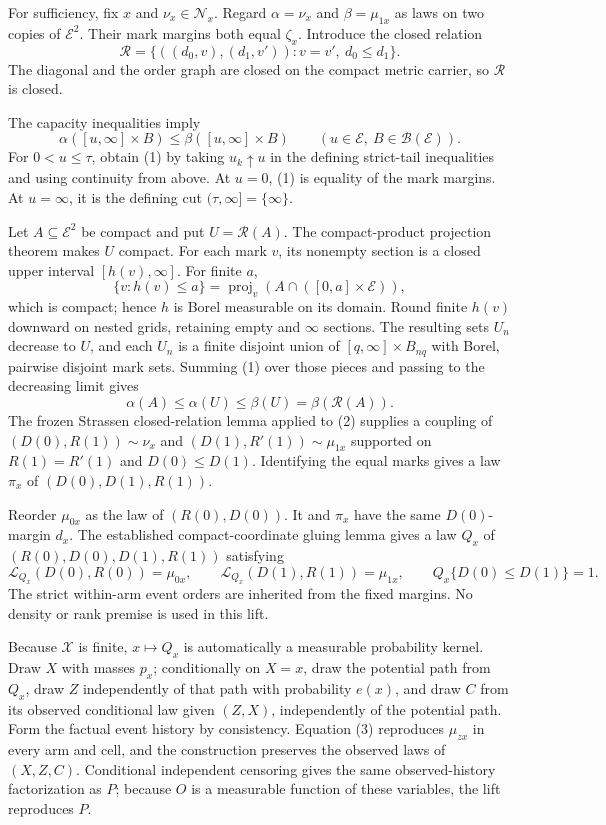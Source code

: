 For sufficiency, fix \(x\) and \(\nu_x\in\mathcal N_x\).  Regard \(\alpha=\nu_x\) and \(\beta=\mu_{1x}\) as laws on two copies of \(\mathcal E^2\).  Their mark margins both equal \(\zeta_x\).  Introduce the closed relation
\[
\mathcal R=\{((d_0,v),(d_1,v')):v=v',\ d_0\leq d_1\}.
\]
The diagonal and the order graph are closed on the compact metric carrier, so \(\mathcal R\) is closed.

The capacity inequalities imply
\[
\alpha([u,\infty]\times B)\leq\beta([u,\infty]\times B)
\qquad(u\in\mathcal E,\ B\in\mathscr B(\mathcal E)).                \tag{1}
\]
For \(0<u\leq\tau\), obtain (1) by taking \(u_k\uparrow u\) in the defining strict-tail inequalities and using continuity from above.  At \(u=0\), (1) is equality of the mark margins.  At \(u=\infty\), it is the defining cut \((\tau,\infty]=\{\infty\}\).

Let \(A\subseteq\mathcal E^2\) be compact and put \(U=\mathcal R(A)\).  The compact-product projection theorem makes \(U\) compact.  For each mark \(v\), its nonempty section is a closed upper interval \([h(v),\infty]\).  For finite \(a\),
\[
\{v:h(v)\leq a\}
=\operatorname{proj}_v\!\left(A\cap([0,a]\times\mathcal E)\right),
\]
which is compact; hence \(h\) is Borel measurable on its domain.  Round finite \(h(v)\) downward on nested grids, retaining empty and \(\infty\) sections.  The resulting sets \(U_n\) decrease to \(U\), and each \(U_n\) is a finite disjoint union of \([q,\infty]\times B_{nq}\) with Borel, pairwise disjoint mark sets.  Summing (1) over those pieces and passing to the decreasing limit gives
\[
\alpha(A)\leq\alpha(U)\leq\beta(U)=\beta(\mathcal R(A)).             \tag{2}
\]
The frozen Strassen closed-relation lemma applied to (2) supplies a coupling of \((D(0),R(1))\sim\nu_x\) and \((D(1),R'(1))\sim\mu_{1x}\) supported on \(R(1)=R'(1)\) and \(D(0)\leq D(1)\).  Identifying the equal marks gives a law \(\pi_x\) of \((D(0),D(1),R(1))\).

Reorder \(\mu_{0x}\) as the law of \((R(0),D(0))\).  It and \(\pi_x\) have the same \(D(0)\)-margin \(d_x\).  The established compact-coordinate gluing lemma gives a law \(Q_x\) of \((R(0),D(0),D(1),R(1))\) satisfying
\[
\mathcal L_{Q_x}(D(0),R(0))=\mu_{0x},\qquad
\mathcal L_{Q_x}(D(1),R(1))=\mu_{1x},\qquad
Q_x\{D(0)\leq D(1)\}=1.                                            \tag{3}
\]
The strict within-arm event orders are inherited from the fixed margins.  No density or rank premise is used in this lift.

Because \(\mathcal X\) is finite, \(x\mapsto Q_x\) is automatically a measurable probability kernel.  Draw \(X\) with masses \(p_x\); conditionally on \(X=x\), draw the potential path from \(Q_x\), draw \(Z\) independently of that path with probability \(e(x)\), and draw \(C\) from its observed conditional law given \((Z,X)\), independently of the potential path.  Form the factual event history by consistency.  Equation (3) reproduces \(\mu_{zx}\) in every arm and cell, and the construction preserves the observed laws of \((X,Z,C)\).  Conditional independent censoring gives the same observed-history factorization as \(P\); because \(O\) is a measurable function of these variables, the lift reproduces \(P\).

